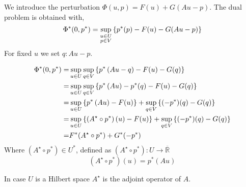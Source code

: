  We introduce the perturbation $\Phi(u, p) = F(u)+G(Au-p)$. The dual problem is obtained with,
 \[
	 {\Phi}^{\ast}(0, {p}^{\ast})=\sup_{\substack{u\in U\\ p \in V} }\left\lbrace {p}^{\ast}(p)-F(u)-G(Au-p)\right\rbrace
 \]
 For fixed $u$ we set $q: Au -p$.
 
 \begin{align*}
 {\Phi}^{\ast}(0, {p}^{\ast})=&\sup_{u\in U} \sup_{q\in V} \left\lbrace{p}^{\ast}\left(Au-q\right)-F(u)-G(q)\right\rbrace\\
 =&\sup_{u\in U} \sup_{q\in V} \left\lbrace{p}^{\ast}\left(Au\right)-{p}^{\ast}(q)-F(u)-G(q)\right\rbrace\\
 =&\sup_{u\in U}  \left\lbrace{p}^{\ast}\left( Au\right)-F(u)\right\rbrace+\sup_{q\in V}\left\lbrace(-{p}^{\ast})(q)-G(q)\right\rbrace\\
  =&\sup_{u\in U}  \left\lbrace(A^\star\circ{p}^{\ast})\left(u\right)-F(u)\right\rbrace+\sup_{q\in V}\left\lbrace(-{p}^{\ast})(q)-G(q)\right\rbrace\\
 =&{F}^{\ast}(A^\star\circ{p}^{\ast})+{G}^{\ast}(-{p}^{\ast})
 \end{align*}
Where $(A^\star\circ p^* )\in U^{*}$, defined as $(A^\star\circ p^*):U\rightarrow \overline{\mathbb{R}}$ \[
	 (A^\star\circ p^*)(u)= p^*(Au)
\]

In case $U$ is a Hilbert space $A^\star$ is the adjoint operator of $A$.
